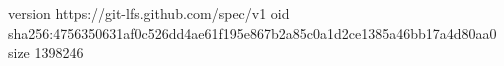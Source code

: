 version https://git-lfs.github.com/spec/v1
oid sha256:4756350631af0c526dd4ae61f195e867b2a85c0a1d2ce1385a46bb17a4d80aa0
size 1398246
